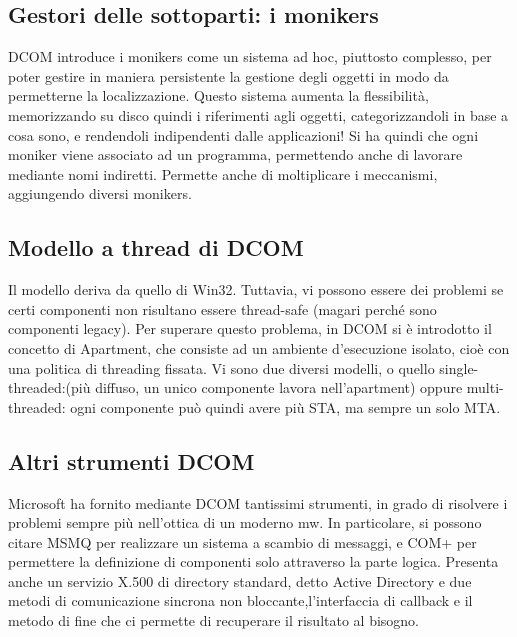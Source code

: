 \subsection{Gestori delle sottoparti: i monikers}
DCOM introduce i monikers come un sistema ad hoc, piuttosto complesso, per poter gestire in maniera persistente la
gestione degli oggetti in modo da permetterne la localizzazione. Questo sistema aumenta la flessibilità, memorizzando su disco quindi i riferimenti agli oggetti,
categorizzandoli in base a cosa sono, e rendendoli indipendenti dalle applicazioni!
Si ha quindi che ogni moniker viene associato ad un programma, permettendo anche di lavorare mediante nomi indiretti.
Permette anche di moltiplicare i meccanismi, aggiungendo diversi monikers.
\subsection{Modello a thread di DCOM}
Il modello deriva da quello di Win32. Tuttavia, vi possono essere dei problemi se certi componenti non risultano essere
thread-safe (magari perché sono componenti legacy). Per superare questo problema, in DCOM si è introdotto il concetto di
Apartment, che consiste ad un ambiente d'esecuzione isolato, cioè con una politica di threading fissata. Vi sono due
diversi modelli, o quello single-threaded:(più diffuso, un unico componente lavora nell'apartment) oppure
multi-threaded: ogni componente può quindi avere più STA, ma sempre un solo MTA.
\subsection{Altri strumenti DCOM}
Microsoft ha fornito mediante DCOM tantissimi strumenti, in grado di risolvere i problemi sempre più nell'ottica di un
moderno mw.
In particolare, si possono citare MSMQ per realizzare un sistema a scambio di messaggi, e COM+ per permettere la
definizione di componenti solo attraverso la parte logica. Presenta anche un servizio X.500 di directory standard, detto Active Directory e due metodi di comunicazione sincrona non bloccante,l'interfaccia di callback e il metodo di fine che ci permette di recuperare il risultato al bisogno.
